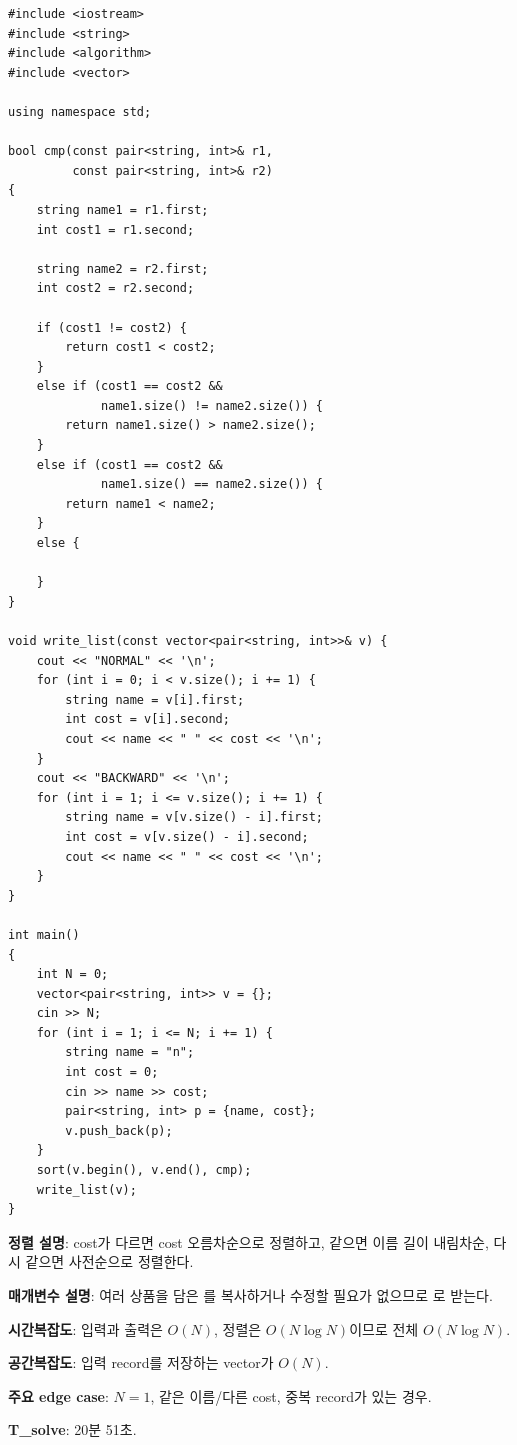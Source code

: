 \begin{answerbox}[학습자 제출 답안]
\begin{lstlisting}
#include <iostream>
#include <string>
#include <algorithm>
#include <vector>

using namespace std;

bool cmp(const pair<string, int>& r1,
         const pair<string, int>& r2)
{
    string name1 = r1.first;
    int cost1 = r1.second;

    string name2 = r2.first;
    int cost2 = r2.second;

    if (cost1 != cost2) {
        return cost1 < cost2;
    }
    else if (cost1 == cost2 &&
             name1.size() != name2.size()) {
        return name1.size() > name2.size();
    }
    else if (cost1 == cost2 &&
             name1.size() == name2.size()) {
        return name1 < name2;
    }
    else {

    }
}

void write_list(const vector<pair<string, int>>& v) {
    cout << "NORMAL" << '\n';
    for (int i = 0; i < v.size(); i += 1) {
        string name = v[i].first;
        int cost = v[i].second;
        cout << name << " " << cost << '\n';
    }
    cout << "BACKWARD" << '\n';
    for (int i = 1; i <= v.size(); i += 1) {
        string name = v[v.size() - i].first;
        int cost = v[v.size() - i].second;
        cout << name << " " << cost << '\n';
    }
}

int main()
{
    int N = 0;
    vector<pair<string, int>> v = {};
    cin >> N;
    for (int i = 1; i <= N; i += 1) {
        string name = "n";
        int cost = 0;
        cin >> name >> cost;
        pair<string, int> p = {name, cost};
        v.push_back(p);
    }
    sort(v.begin(), v.end(), cmp);
    write_list(v);
}
\end{lstlisting}

\textbf{정렬 설명}: cost가 다르면 cost 오름차순으로 정렬하고, 같으면 이름 길이 내림차순, 다시 같으면 사전순으로 정렬한다.

\textbf{매개변수 설명}: 여러 상품을 담은 를 복사하거나 수정할 필요가 없으므로 로 받는다.

\textbf{시간복잡도}: 입력과 출력은 $O(N)$, 정렬은 $O(N\log N)$이므로 전체 $O(N\log N)$.

\textbf{공간복잡도}: 입력 record를 저장하는 vector가 $O(N)$.

\textbf{주요 edge case}: $N=1$, 같은 이름/다른 cost, 중복 record가 있는 경우.

\textbf{T\_solve}: 20분 51초.
\end{answerbox}

